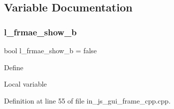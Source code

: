 \subsection{Variable Documentation}
\mbox{\label{group___g_u_i_ga1abd408fef2ab9bfeafa4b963d2e4119}} 
\subsubsection{l\_frmae\_show\_b}
{\footnotesize\ttfamily bool l\+\_\+frmae\+\_\+show\+\_\+b = false}

Define

Local variable 

Definition at line 55 of file in\+\_\+js\+\_\+gui\+\_\+frame\+\_\+cpp.\+cpp.

